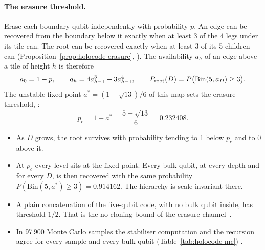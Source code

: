 \paragraph{The erasure threshold.} Erase each boundary qubit independently with probability $p$. An edge can be recovered from the
boundary below it exactly when at least 3 of the 4 legs under its tile can. The root can be recovered exactly when at least 3 of its 5
children can (Proposition~\ref{prop:holocode-erasure}, ). The availability $a_h$ of an edge above a tile of height $h$ is
therefore
\begin{equation}\label{eq:holocode-rec}
a_0=1-p,\qquad a_h=4a_{h-1}^3-3a_{h-1}^4,\qquad P_{\rm root}(D)=P\bigl(\mathrm{Bin}(5,a_D)\ge3\bigr).
\end{equation}
The unstable fixed point $a^*=(1+\sqrt{13})/6$ of this map sets the erasure threshold, :
\begin{equation}\label{eq:holocode-pc}
p_c=1-a^*=\frac{5-\sqrt{13}}{6}=0.232408 .
\end{equation}
\begin{itemize}[nosep]
\item As $D$ grows, the root survives with probability tending to 1 below $p_c$ and to 0 above it.
\item At $p_c$ every level sits at the fixed point. Every bulk qubit, at every depth and for every $D$, is then recovered with the same
  probability $P(\mathrm{Bin}(5,a^*)\ge3)=0.914162$. The hierarchy is scale invariant there.
\item A plain concatenation of the five-qubit code, with no bulk qubit inside, has threshold $1/2$. That is the no-cloning bound of the
  erasure channel~\cite{bennett1997}.
\item In 97\,900 Monte Carlo samples the stabiliser computation and the recursion agree for every sample and every bulk qubit
  (Table~\ref{tab:holocode-mc}) .
\end{itemize}


